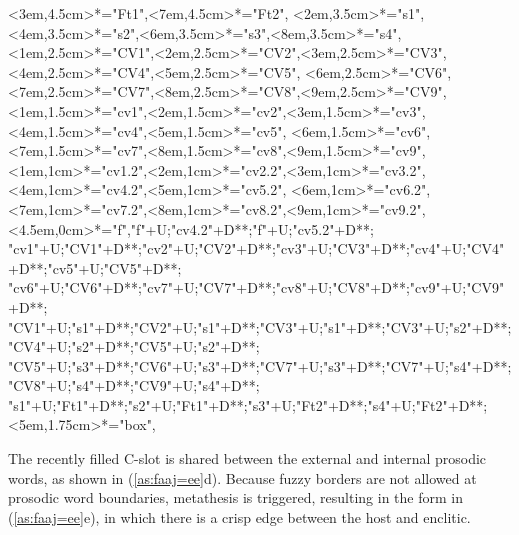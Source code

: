 \begin{multicols}{2}
\begin{exe}
{\begin{xlist}
{		<3em,4.5cm>*="Ft1",<7em,4.5cm>*="Ft2",
		<2em,3.5cm>*="s1",<4em,3.5cm>*="s2",<6em,3.5cm>*="s3",<8em,3.5cm>*="s4",
		<1em,2.5cm>*="CV1",<2em,2.5cm>*="CV2",<3em,2.5cm>*="CV3",<4em,2.5cm>*="CV4",<5em,2.5cm>*="CV5",
		<6em,2.5cm>*="CV6",<7em,2.5cm>*="CV7",<8em,2.5cm>*="CV8",<9em,2.5cm>*="CV9",
		<1em,1.5cm>*="cv1",<2em,1.5cm>*="cv2",<3em,1.5cm>*\as{ }="cv3",<4em,1.5cm>*="cv4",<5em,1.5cm>*\as{\j}="cv5",
		<6em,1.5cm>*="cv6",<7em,1.5cm>*\as{ }="cv7",<8em,1.5cm>*="cv8",<9em,1.5cm>*\as{ }="cv9",
		<1em,1cm>*="cv1.2",<2em,1cm>*="cv2.2",<3em,1cm>*\as{ }="cv3.2",<4em,1cm>*="cv4.2",<5em,1cm>*\as{\j}="cv5.2",
		<6em,1cm>*="cv6.2",<7em,1cm>*\as{ }="cv7.2",<8em,1cm>*="cv8.2",<9em,1cm>*\as{ }="cv9.2",
		<4.5em,0cm>*\as{\tsc{[+fr.]}}="f","f"+U;"cv4.2"+D**\dir{-};"f"+U;"cv5.2"+D**\dir{-};
		"cv1"+U;"CV1"+D**\dir{-};"cv2"+U;"CV2"+D**\dir{-};"cv3"+U;"CV3"+D**\dir{};"cv4"+U;"CV4"+D**\dir{-};"cv5"+U;"CV5"+D**\dir{-};
		"cv6"+U;"CV6"+D**\dir{-};"cv7"+U;"CV7"+D**\dir{};"cv8"+U;"CV8"+D**\dir{-};"cv9"+U;"CV9"+D**\dir{};
		"CV1"+U;"s1"+D**\dir{-};"CV2"+U;"s1"+D**\dir{-};"CV3"+U;"s1"+D**\dir{-};"CV3"+U;"s2"+D**\dir{-};"CV4"+U;"s2"+D**\dir{-};"CV5"+U;"s2"+D**\dir{-};
		"CV5"+U;"s3"+D**\dir{-};"CV6"+U;"s3"+D**\dir{-};"CV7"+U;"s3"+D**\dir{-};"CV7"+U;"s4"+D**\dir{-};"CV8"+U;"s4"+D**\dir{-};"CV9"+U;"s4"+D**\dir{-};
		"s1"+U;"Ft1"+D**\dir{-};"s2"+U;"Ft1"+D**\dir{-};"s3"+U;"Ft2"+D**\dir{-};"s4"+U;"Ft2"+D**\dir{-};
		<5em,1.75cm>*="box",
	\endxy}\label{as:faaj=ee2}
	\end{xlist}}
\end{exe}
\end{multicols}

The recently filled C-slot is shared between the external and internal prosodic words,
as shown in (\ref{as:faaj=ee}d).
Because fuzzy borders are not allowed at prosodic word boundaries,
metathesis is triggered, resulting in the form in (\ref{as:faaj=ee}e),
in which there is a crisp edge between the host and enclitic.

